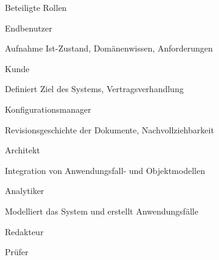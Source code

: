 \documentclass[a4paper]{article}
\begin{document}
\begin{multicols}{3}
  Beteiligte Rollen
  \begin{itemize*}
    \item Endbenutzer
          \begin{itemize*}
            \item Aufnahme Ist-Zustand, Domänenwissen, Anforderungen
          \end{itemize*}
    \item Kunde
          \begin{itemize*}
            \item Definiert Ziel des Systems, Vertragsverhandlung
          \end{itemize*}
    \item Konfigurationsmanager
          \begin{itemize*}
            \item Revisionsgeschichte der Dokumente, Nachvollziehbarkeit
          \end{itemize*}
    \item Architekt
          \begin{itemize*}
            \item Integration von Anwendungsfall- und Objektmodellen
          \end{itemize*}
    \item Analytiker
          \begin{itemize*}
            \item Modelliert das System und erstellt Anwendungsfälle
          \end{itemize*}
    \item Redakteur
    \item Prüfer
  \end{itemize*}


\end{multicols}
\end{document}
